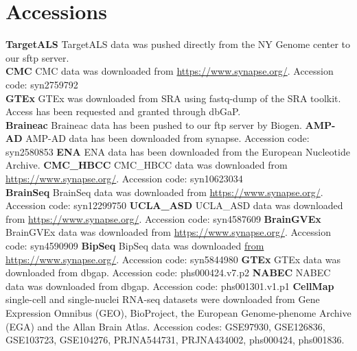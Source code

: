 \section*{Accessions}
\textbf{TargetALS} TargetALS data was pushed directly from the NY Genome center to our sftp server. \\
\textbf{CMC} CMC data was downloaded from \url{https://www.synapse.org/}. Accession code: syn2759792 \\
\textbf{GTEx} GTEx was downloaded from SRA using fastq-dump of the SRA toolkit. Access has been requested and granted through dbGaP. \\
\textbf{Braineac} Braineac data has been pushed to our ftp server by Biogen. 
\textbf{AMP-AD} AMP-AD data has been downloaded from synapse. Accession code: syn2580853 
\textbf{ENA} ENA data has been downloaded from the European Nucleotide Archive.
\textbf{CMC\_HBCC} CMC\_HBCC data was downloaded from \url{https://www.synapse.org/}. Accession code: syn10623034 \\
\textbf{BrainSeq} BrainSeq data was downloaded from \url{https://www.synapse.org/}. Accession code: syn12299750 
\textbf{UCLA\_ASD} UCLA\_ASD data was downloaded from \url{https://www.synapse.org/}. Accession code: syn4587609 
\textbf{BrainGVEx} BrainGVEx data was downloaded from \url{https://www.synapse.org/}. Accession code: syn4590909 
\textbf{BipSeq} BipSeq data was downloaded \url{from https://www.synapse.org/}. Accession code: syn5844980 
\textbf{GTEx} GTEx data was downloaded from dbgap. Accession code: phs000424.v7.p2 
\textbf{NABEC} NABEC data was downloaded from dbgap. Accession code: phs001301.v1.p1 
\textbf{CellMap} single-cell and single-nuclei RNA-seq datasets were downloaded from Gene Expression Omnibus (GEO), BioProject, the European Genome-phenome Archive (EGA) and the Allan Brain Atlas. Accession codes: GSE97930, GSE126836, GSE103723, GSE104276, PRJNA544731, PRJNA434002, phs000424, phs001836. 

